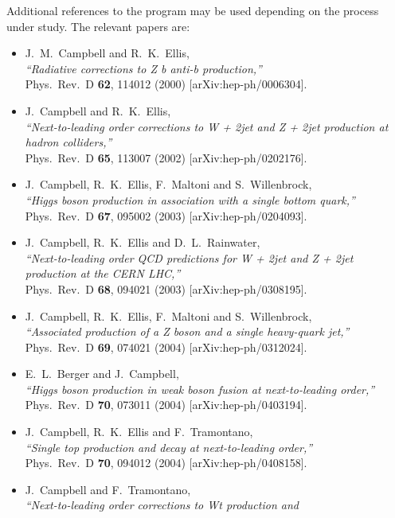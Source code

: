 \documentclass[12pt]{article}
\begin{document}
Additional references to the program may be used depending on the process under study. The relevant papers are:
\begin{itemize}
\item J.~M.~Campbell and R.~K.~Ellis, \\
  {\it ``Radiative corrections to Z b anti-b production,''} \\
  Phys.\ Rev.\ D {\bf 62}, 114012 (2000)
  [arXiv:hep-ph/0006304].
\item J.~Campbell and R.~K.~Ellis, \\
  {\it ``Next-to-leading order corrections to W + 2jet and Z + 2jet production  at
   hadron colliders,''} \\
  Phys.\ Rev.\ D {\bf 65}, 113007 (2002)
  [arXiv:hep-ph/0202176].
\item J.~Campbell, R.~K.~Ellis, F.~Maltoni and S.~Willenbrock, \\
  {\it ``Higgs boson production in association with a single bottom quark,''} \\
  Phys.\ Rev.\ D {\bf 67}, 095002 (2003)
  [arXiv:hep-ph/0204093].
\item J.~Campbell, R.~K.~Ellis and D.~L.~Rainwater, \\
  {\it ``Next-to-leading order QCD predictions for W + 2jet and Z + 2jet  production
     at the CERN LHC,''} \\
  Phys.\ Rev.\ D {\bf 68}, 094021 (2003)
  [arXiv:hep-ph/0308195].
\item J.~Campbell, R.~K.~Ellis, F.~Maltoni and S.~Willenbrock, \\
  {\it ``Associated production of a Z boson and a single heavy-quark jet,''} \\
  Phys.\ Rev.\ D {\bf 69}, 074021 (2004)
  [arXiv:hep-ph/0312024].
\item E.~L.~Berger and J.~Campbell, \\
  {\it ``Higgs boson production in weak boson fusion at next-to-leading order,''} \\
  Phys.\ Rev.\ D {\bf 70}, 073011 (2004)
  [arXiv:hep-ph/0403194].
\item J.~Campbell, R.~K.~Ellis and F.~Tramontano, \\
  {\it ``Single top production and decay at next-to-leading order,''} \\
  Phys.\ Rev.\ D {\bf 70}, 094012 (2004)
  [arXiv:hep-ph/0408158].
\item J.~Campbell and F.~Tramontano, \\
  {\it ``Next-to-leading order corrections to Wt production and
}
\end{itemize}
\end{document}

